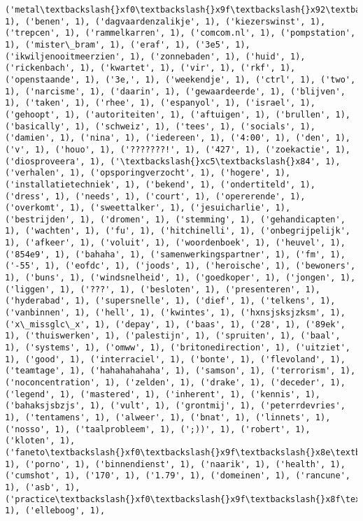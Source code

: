 \documentclass{article}
\begin{document}
\begin{Verbatim}[commandchars=\\\{\}]
('metal\textbackslash{}xf0\textbackslash{}x9f\textbackslash{}x92\textbackslash{}x80\textbackslash{}xf0\textbackslash{}x9f\textbackslash{}x94\textbackslash{}xa5\textbackslash{}xf0\textbackslash{}x9f\textbackslash{}x94\textbackslash{}xa5', 1), ('benen', 1), ('dagvaardenzalikje', 1), ('kiezerswinst', 1), ('trepcen', 1), ('rammelkarren', 1), ('comcom.nl', 1), ('pompstation', 1), ('mister\_bram', 1), ('eraf', 1), ('3e5', 1), ('ikwiljenooitmeerzien', 1), ('zonnebaden', 1), ('huid', 1), ('rickenbach', 1), ('kwartet', 1), ('vir', 1), ('rkf', 1), ('openstaande', 1), ('3e,', 1), ('weekendje', 1), ('ctrl', 1), ('two', 1), ('narcisme', 1), ('daarin', 1), ('gewaardeerde', 1), ('blijven', 1), ('taken', 1), ('rhee', 1), ('espanyol', 1), ('israel', 1), ('gehoopt', 1), ('autoriteiten', 1), ('aftuigen', 1), ('brullen', 1), ('basically', 1), ('schweiz', 1), ('tees', 1), ('socials', 1), ('damien', 1), ('nina', 1), ('iedereen', 1), ('4:00', 1), ('den', 1), ('v', 1), ('houo', 1), ('???????!', 1), ('427', 1), ('zoekactie', 1), ('diosproveera', 1), ('\textbackslash{}xc5\textbackslash{}x84', 1), ('verhalen', 1), ('opsporingverzocht', 1), ('hogere', 1), ('installatietechniek', 1), ('bekend', 1), ('ondertiteld', 1), ('dress', 1), ('needs', 1), ('court', 1), ('opererende', 1), ('overkomt', 1), ('sweettalker', 1), ('jesuicharlie', 1), ('bestrijden', 1), ('dromen', 1), ('stemming', 1), ('gehandicapten', 1), ('wachten', 1), ('fu', 1), ('hitchinelli', 1), ('onbegrijpelijk', 1), ('afkeer', 1), ('voluit', 1), ('woordenboek', 1), ('heuvel', 1), ('854e9', 1), ('bahaha', 1), ('samenwerkingspartner', 1), ('fm', 1), ('-55', 1), ('eofdc', 1), ('joods', 1), ('heroische', 1), ('bewoners', 1), ('buns', 1), ('windsnelheid', 1), ('goedkoper', 1), ('jongen', 1), ('liggen', 1), ('???', 1), ('besloten', 1), ('presenteren', 1), ('hyderabad', 1), ('supersnelle', 1), ('dief', 1), ('telkens', 1), ('vanbinnen', 1), ('hell', 1), ('kwintes', 1), ('hxnsjsksjzksm', 1), ('x\_missglc\_x', 1), ('depay', 1), ('baas', 1), ('28', 1), ('89ek', 1), ('thuiswerken', 1), ('palestijn', 1), ('spruiten', 1), ('baal', 1), ('systems', 1), ('omww', 1), ('britonedirection', 1), ('uitziet', 1), ('good', 1), ('interraciel', 1), ('bonte', 1), ('flevoland', 1), ('teamtage', 1), ('hahahahahaha', 1), ('samson', 1), ('terrorism', 1), ('noconcentration', 1), ('zelden', 1), ('drake', 1), ('deceder', 1), ('legend', 1), ('mastered', 1), ('inherent', 1), ('kennis', 1), ('bahaksjsbzjs', 1), ('vult', 1), ('grontmij', 1), ('peterrdevries', 1), ('tentamens', 1), ('alweer', 1), ('bnat', 1), ('linnets', 1), ('nosso', 1), ('taalprobleem', 1), (';))', 1), ('robert', 1), ('kloten', 1), ('faneto\textbackslash{}xf0\textbackslash{}x9f\textbackslash{}x8e\textbackslash{}xa7\textbackslash{}xf0\textbackslash{}x9f\textbackslash{}x94\textbackslash{}xa5\textbackslash{}xf0\textbackslash{}x9f\textbackslash{}x92\textbackslash{}x89', 1), ('porno', 1), ('binnendienst', 1), ('naarik', 1), ('health', 1), ('cumshot', 1), ('170', 1), ('1.79', 1), ('domeinen', 1), ('rancune', 1), ('asb', 1), ('practice\textbackslash{}xf0\textbackslash{}x9f\textbackslash{}x8f\textbackslash{}x80\textbackslash{}xf0\textbackslash{}x9f\textbackslash{}x92\textbackslash{}xaa\textbackslash{}xf0\textbackslash{}x9f\textbackslash{}x92\textbackslash{}xaf', 1), ('elleboog', 1), 
\end{Verbatim}
\end{document}
